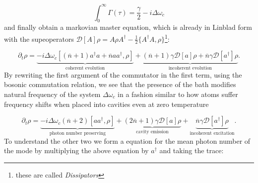 \begin{equation}
  \int_{0}^{\infty}\Gamma(\tau)=\frac{\gamma}{2} -i \Delta \omega_{c}
\end{equation}
and finally obtain a markovian master equation, which is already in Linblad form with the supeoperators $\mathcal{D}[A]\rho=A\rho A^{\dagger}-\frac{1}{2}\{A^{\dagger}A,\rho\}$\footnote{these are called \textit{Dissipators}}:

\begin{equation}
  \partial_{t}\rho = \underbrace{-i\Delta\omega_{c}[(\overline{n}+1)a^{\dagger}a + \overline{n}aa^{\dagger}, \rho]}_{\text{coherent evolution}} + \underbrace{(\overline{n}+1)\gamma\mathcal{D}[a]\rho +
\overline{n}\gamma\mathcal{D}[a^{\dagger}]\rho}_{\text{incoherent evolution}}.
\end{equation}
By rewriting the first argument of the commutator  in the first term, using the bosonic commutation relation, we see that the presence of the bath modifies natural frequency of the system $\Delta\omega_{c}$ in a fashion similar to how atoms suffer frequency shifts when placed into cavities even at zero temperature \cite{dutra2005cavity}

\begin{equation}
\partial_{t}\rho = \underbrace{-i\Delta\omega_{c}(\overline{n}+2)[aa^{\dagger}, \rho]}_{\text{photon number preserving}} + \underbrace{(2\overline{n}+1)\gamma\mathcal{D}[a]\rho}_{\text{cavity emission}} +\underbrace{\overline{n}\gamma\mathcal{D}[a^{\dagger}]\rho}_{\text{incoherent excitation}}.\label{eq:cavity_model}
\end{equation}
To understand the other two we form a equation for the mean photon number of the mode by multiplying the above equation by $a^{\dagger}$ and
taking the trace:

